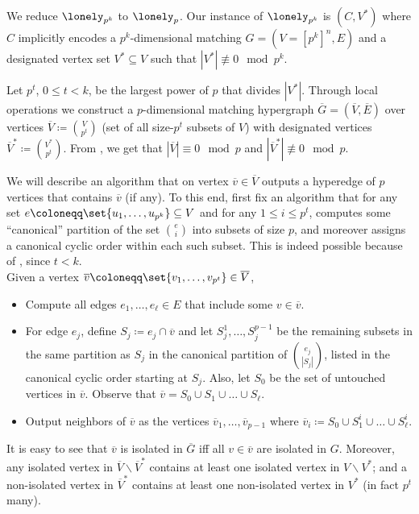 \noindent We reduce $\lonely_{p^k}$ to $\lonely_p$. Our instance of $\lonely_{p^k}$ is $(C,V^*)$ where $C$ implicitly encodes a ${p^k}$-dimensional matching $G = (V = [p^k]^n, E)$ and a designated vertex set $V^* \subseteq V$ such that $|V^*| \not\equiv 0 \mod{p^k}$.

Let $p^t$, $0 \le t < k$, be the largest power of $p$ that divides $|V^*|$. Through local operations we construct a $p$-dimensional matching hypergraph $\overline{G} = (\overline{V}, \overline{E})$ over vertices $\overline{V} \coloneqq \binom{V}{p^t}$ (set of all size-$p^t$ subsets of $V$) with designated vertices $\overline{V}^*\coloneqq\binom{V^*}{p^t}$. From , we get that $|\overline{V}| \equiv 0 \mod{p}$ and $|\overline{V}^*| \not\equiv 0 \mod{p}$.

We will describe an algorithm that on vertex $\overline{v} \in \overline{V}$ outputs a hyperedge of $p$ vertices that contains $\overline{v}$ (if any). To this end, first fix an algorithm that for any set $e \coloneqq \set{u_1, \ldots, u_{p^k}} \subseteq V$ and for any $1 \le i \le p^t$, computes some ``canonical'' partition of the set $\binom{e}{i}$ into subsets of size $p$, and moreover assigns a canonical cyclic order within each such subset. This is indeed possible because of , since $t < k$.\\[-0.2cm]

\noindent Given a vertex $\overline{v} \coloneqq \set{v_1, \ldots, v_{p^t}} \in \overline{V}$,\vspace{-0.2cm}
\begin{itemize}[label=$\triangleright$,leftmargin=0.6cm]
\item Compute all edges $e_1, \ldots, e_\ell \in E$ that include some $v \in \overline{v}$.
\item For edge $e_j$, define $S_j \coloneqq e_j \cap \overline{v}$ and let $S_j^1, \ldots, S_j^{p-1}$ be the remaining subsets in the same partition as $S_j$ in the canonical partition of $\binom{e_j}{|S_j|}$, listed in the canonical cyclic order starting at $S_j$. Also, let $S_0$ be the set of untouched vertices in $\overline{v}$. Observe that $\overline{v} = S_0 \cup S_1 \cup \ldots \cup S_\ell$.
\item Output neighbors of $\overline{v}$ as the vertices $\overline{v}_1, \ldots, \overline{v}_{p-1}$ where $\overline{v}_i \coloneqq S_0 \cup S_1^i \cup \ldots \cup S_{\ell}^i$.
\end{itemize}

\noindent It is easy to see that $\overline{v}$ is isolated in $\overline{G}$ iff all $v \in \overline{v}$ are isolated in $G$. Moreover, any isolated vertex in $\overline{V} \smallsetminus \overline{V}^*$ contains at least one isolated vertex in $V \smallsetminus V^*$; and a non-isolated vertex in $\overline{V}^*$ contains at least one non-isolated vertex in $V^*$ (in fact $p^t$ many).

